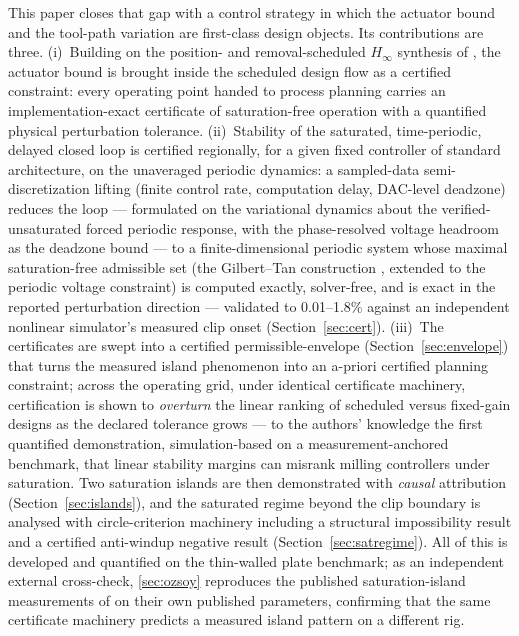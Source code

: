 \documentclass[preprint,12pt]{elsarticle}
\newcommand{\hinf}{\ensuremath{H_\infty}}
\begin{document}
This paper closes that gap with a control strategy in which the
actuator bound and the tool-path variation are first-class design
objects. Its contributions are three.
(i)~Building on the position- and removal-scheduled \hinf{} synthesis
of \cite{companion}, the actuator bound is brought inside the
scheduled design flow as a certified constraint: every operating point
handed to process planning carries an implementation-exact certificate
of saturation-free operation with a quantified physical perturbation
tolerance.
(ii)~Stability of the saturated, time-periodic, delayed closed loop is
certified regionally, for a given fixed controller of standard
architecture, on the unaveraged periodic dynamics: a sampled-data
semi-discretization lifting (finite control rate, computation delay,
DAC-level deadzone) reduces the loop --- formulated on the variational
dynamics about the verified-unsaturated forced periodic response, with
the phase-resolved voltage headroom as the deadzone bound --- to a
finite-dimensional periodic system whose maximal saturation-free
admissible set (the Gilbert--Tan construction
\cite{gilbert1991maximal}, extended to the periodic voltage
constraint) is computed exactly, solver-free, and is exact in the
reported perturbation direction --- validated to 0.01--1.8\% against
an independent nonlinear simulator's measured clip onset
(Section~\ref{sec:cert}).
(iii)~The certificates are swept into a certified permissible-envelope
(Section~\ref{sec:envelope}) that turns the measured island phenomenon
into an a-priori certified planning constraint; across the operating
grid, under identical certificate machinery, certification is shown to
\emph{overturn} the linear ranking of scheduled versus fixed-gain
designs as the declared tolerance grows --- to the authors' knowledge
the first quantified demonstration, simulation-based on a
measurement-anchored benchmark, that linear stability margins can
misrank milling controllers under saturation. Two saturation islands
are then demonstrated with \emph{causal} attribution
(Section~\ref{sec:islands}), and the saturated regime beyond the clip
boundary is analysed with circle-criterion machinery including a
structural impossibility result and a certified anti-windup negative
result (Section~\ref{sec:satregime}). All of this is developed and
quantified on the thin-walled plate benchmark; as an independent
external cross-check, \ref{sec:ozsoy} reproduces the
published saturation-island measurements of \cite{ozsoy2025mssp} on
their own published parameters, confirming that the same certificate
machinery predicts a measured island pattern on a different rig.
\end{document}
